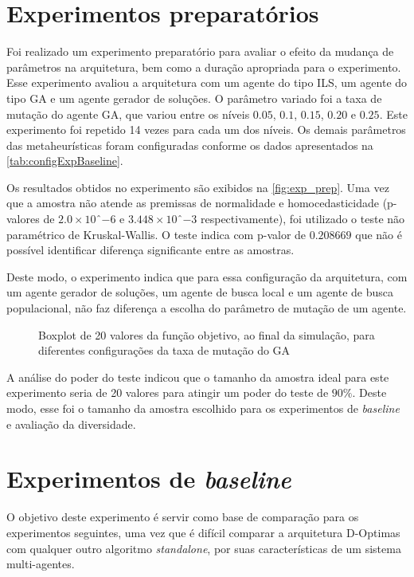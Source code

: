\section{Experimentos preparatórios}
\label{sec:prep}
Foi realizado um experimento preparatório para avaliar o efeito da mudança de parâmetros na arquitetura, bem como a duração apropriada para o experimento. Esse experimento avaliou a arquitetura com um agente do tipo ILS, um agente do tipo GA e um agente gerador de soluções. O parâmetro variado foi a taxa de mutação do agente GA, que variou entre os níveis $0.05$, $0.1$, $0.15$, $0.20$ e $0.25$. Este experimento foi repetido 14 vezes para cada um dos níveis. Os demais parâmetros das metaheurísticas foram configuradas conforme os dados apresentados na \autoref{tab:configExpBaseline}.

Os resultados obtidos no experimento são exibidos na \autoref{fig:exp_prep}. Uma vez que a amostra não atende as premissas de normalidade e homocedasticidade (p-valores de $2.0 \times 10ˆ{-6}$ e $3.448 \times 10ˆ{-3}$ respectivamente), foi utilizado o teste não paramétrico de Kruskal-Wallis. O teste indica com p-valor de $0.208669$ que não é possível identificar diferença significante entre as amostras.

Deste modo, o experimento indica que para essa configuração da arquitetura, com um agente gerador de soluções, um agente de busca local e um agente de busca populacional, não faz diferença a escolha do parâmetro de mutação de um agente. 

\begin{figure}
    \centering
    \caption{Boxplot de 20 valores da função objetivo, ao final da simulação, para diferentes configurações da taxa de mutação do GA}
    
    \label{fig:exp_prep}
\end{figure}

A análise do poder do teste indicou que o tamanho da amostra ideal para este experimento seria de 20 valores para atingir um poder do teste de $90\%$. Deste modo, esse foi o tamanho da amostra escolhido para os experimentos de \textit{baseline} e avaliação da diversidade.

\section{Experimentos de \textit{baseline}}
\label{sec:baseline}
O objetivo deste experimento é servir como base de comparação para os experimentos seguintes, uma vez que é difícil comparar a arquitetura D-Optimas com qualquer outro algoritmo \textit{standalone}, por suas características de um sistema multi-agentes.

